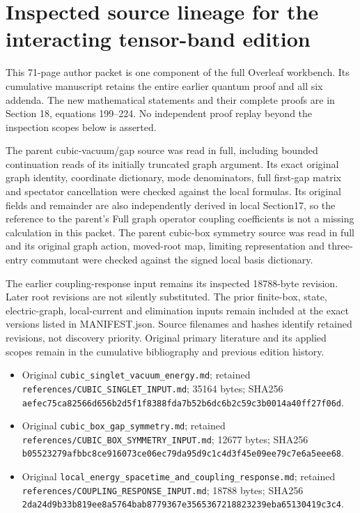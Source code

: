 \section{Inspected source lineage for the interacting tensor-band
edition}\label{source-lineage-interacting-band-md-inspected-source-lineage-for-the-interacting-tensor-band-edition}

This 71-page author packet is one component of the full Overleaf
workbench. Its cumulative manuscript retains the entire earlier quantum
proof and all six addenda. The new mathematical statements and their
complete proofs are in Section 18, equations 199--224. No independent
proof replay beyond the inspection scopes below is asserted.

The parent cubic-vacuum/gap source was read in full, including bounded
continuation reads of its initially truncated graph argument. Its exact
original graph identity, coordinate dictionary, mode denominators, full
first-gap matrix and spectator cancellation were checked against the
local formulas. Its original fields and remainder are also independently
derived in local Section17, so the reference to the parent's Full graph
operator coupling coefficients is not a missing calculation in this
packet. The parent cubic-box symmetry source was read in full and its
original graph action, moved-root map, limiting representation and
three-entry commutant were checked against the signed local basis
dictionary.

The earlier coupling-response input remains its inspected 18788-byte
revision. Later root revisions are not silently substituted. The prior
finite-box, state, electric-graph, local-current and elimination inputs
remain included at the exact versions listed in MANIFEST.json. Source
filenames and hashes identify retained revisions, not discovery
priority. Original primary literature and its applied scopes remain in
the cumulative bibliography and previous edition history.

\begin{itemize}
\tightlist
\item
  Original \texttt{cubic\_singlet\_vacuum\_energy.md}; retained
  \texttt{references/CUBIC\_SINGLET\_INPUT.md}; 35164 bytes; SHA256
  \texttt{aefec75ca82566d656b2d5f1f8388fda7b52b6dc6b2c59c3b0014a40ff27f06d}.
\item
  Original \texttt{cubic\_box\_gap\_symmetry.md}; retained
  \texttt{references/CUBIC\_BOX\_SYMMETRY\_INPUT.md}; 12677 bytes;
  SHA256
  \texttt{b05523279afbbc8ce916073ce06ec79da95d9c1c4d3f45e09ee79c7e6a5eee68}.
\item
  Original
  \texttt{local\_energy\_spacetime\_and\_coupling\_response.md};
  retained \texttt{references/COUPLING\_RESPONSE\_INPUT.md}; 18788
  bytes; SHA256
  \texttt{2da24d9b33b819ee8a5764bab8779367e3565367218823239eba65130419c3c4}.
\end{itemize}

